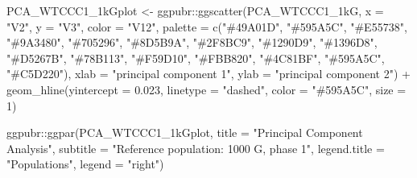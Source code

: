 \documentclass[
]{book}
\newenvironment{Shaded}{\begin{snugshade}}{\end{snugshade}}
\newcommand{\AttributeTok}[1]{\textcolor[rgb]{0.77,0.63,0.00}{#1}}
\newcommand{\DecValTok}[1]{\textcolor[rgb]{0.00,0.00,0.81}{#1}}
\newcommand{\FloatTok}[1]{\textcolor[rgb]{0.00,0.00,0.81}{#1}}
\newcommand{\FunctionTok}[1]{\textcolor[rgb]{0.00,0.00,0.00}{#1}}
\newcommand{\NormalTok}[1]{#1}
\newcommand{\OtherTok}[1]{\textcolor[rgb]{0.56,0.35,0.01}{#1}}
\newcommand{\SpecialCharTok}[1]{\textcolor[rgb]{0.00,0.00,0.00}{#1}}
\newcommand{\StringTok}[1]{\textcolor[rgb]{0.31,0.60,0.02}{#1}}
\begin{document}
\begin{Shaded}
\end{Shaded}

\begin{Shaded}
\begin{Highlighting}[]
\NormalTok{PCA\_WTCCC1\_1kGplot }\OtherTok{\textless{}{-}}\NormalTok{ ggpubr}\SpecialCharTok{::}\FunctionTok{ggscatter}\NormalTok{(PCA\_WTCCC1\_1kG, }\AttributeTok{x =} \StringTok{"V2"}\NormalTok{, }\AttributeTok{y =} \StringTok{"V3"}\NormalTok{,}
                                        \AttributeTok{color =} \StringTok{"V12"}\NormalTok{,}
                                        \AttributeTok{palette =} \FunctionTok{c}\NormalTok{(}\StringTok{"\#49A01D"}\NormalTok{, }\StringTok{"\#595A5C"}\NormalTok{, }\StringTok{"\#E55738"}\NormalTok{, }\StringTok{"\#9A3480"}\NormalTok{, }\StringTok{"\#705296"}\NormalTok{, }
                                                    \StringTok{"\#8D5B9A"}\NormalTok{, }\StringTok{"\#2F8BC9"}\NormalTok{, }\StringTok{"\#1290D9"}\NormalTok{, }\StringTok{"\#1396D8"}\NormalTok{, }\StringTok{"\#D5267B"}\NormalTok{, }
                                                    \StringTok{"\#78B113"}\NormalTok{, }\StringTok{"\#F59D10"}\NormalTok{, }\StringTok{"\#FBB820"}\NormalTok{, }\StringTok{"\#4C81BF"}\NormalTok{, }\StringTok{"\#595A5C"}\NormalTok{, }\StringTok{"\#C5D220"}\NormalTok{),}
                                        \AttributeTok{xlab =} \StringTok{"principal component 1"}\NormalTok{, }\AttributeTok{ylab =} \StringTok{"principal component 2"}\NormalTok{) }\SpecialCharTok{+}
  \FunctionTok{geom\_hline}\NormalTok{(}\AttributeTok{yintercept =} \FloatTok{0.023}\NormalTok{, }\AttributeTok{linetype =} \StringTok{"dashed"}\NormalTok{,}
                \AttributeTok{color =} \StringTok{"\#595A5C"}\NormalTok{, }\AttributeTok{size =} \DecValTok{1}\NormalTok{)}

\NormalTok{  ggpubr}\SpecialCharTok{::}\FunctionTok{ggpar}\NormalTok{(PCA\_WTCCC1\_1kGplot,}
            \AttributeTok{title =} \StringTok{"Principal Component Analysis"}\NormalTok{,}
            \AttributeTok{subtitle =} \StringTok{"Reference population: 1000 G, phase 1"}\NormalTok{,}
            \AttributeTok{legend.title =} \StringTok{"Populations"}\NormalTok{, }\AttributeTok{legend =} \StringTok{"right"}\NormalTok{)}
\end{Highlighting}
\end{Shaded}
\end{document}
